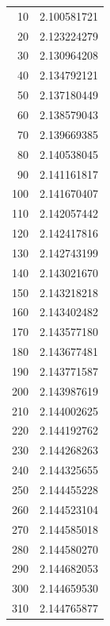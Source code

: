 \documentclass{article}
\makeatletter
\let\mcnewpage=\newpage
\newcommand{\TrickSupertabularIntoMulticols}{%
\renewcommand\newpage{%
    \if@firstcolumn%
        \hrule width\linewidth height0pt%
            \columnbreak%
        \else%
          \mcnewpage%
        \fi%
}%
}
\theoremstyle{definition}
\makeatother
\begin{document}
	\begin{center}
	\begin{multicols*}{3}
	\TrickSupertabularIntoMulticols




	\tablelasttail{\bottomrule}


	\begin{supertabular*}{.26\textwidth}{rl}
		10 & 2.100581721 \\
		20 & 2.123224279 \\
		30 & 2.130964208 \\
		40 & 2.134792121 \\
		50 & 2.137180449 \\
		60 & 2.138579043 \\
		70 & 2.139669385 \\
		80 & 2.140538045 \\
		90 & 2.141161817 \\
		100 & 2.141670407 \\
		110 & 2.142057442 \\
		120 & 2.142417816 \\
		130 & 2.142743199 \\
		140 & 2.143021670 \\
		150 & 2.143218218 \\
		160 & 2.143402482 \\
		170 & 2.143577180 \\
		180 & 2.143677481 \\
		190 & 2.143771587 \\
		200 & 2.143987619 \\
		210 & 2.144002625 \\
		220 & 2.144192762 \\
		230 & 2.144268263 \\
		240 & 2.144325655 \\
		250 & 2.144455228 \\
		260 & 2.144523104 \\
		270 & 2.144585018 \\
		280 & 2.144580270 \\
		290 & 2.144682053 \\
		300 & 2.144659530 \\
		310 & 2.144765877 \\

\end{supertabular*}
\end{multicols*}
\end{center}
\end{document}
